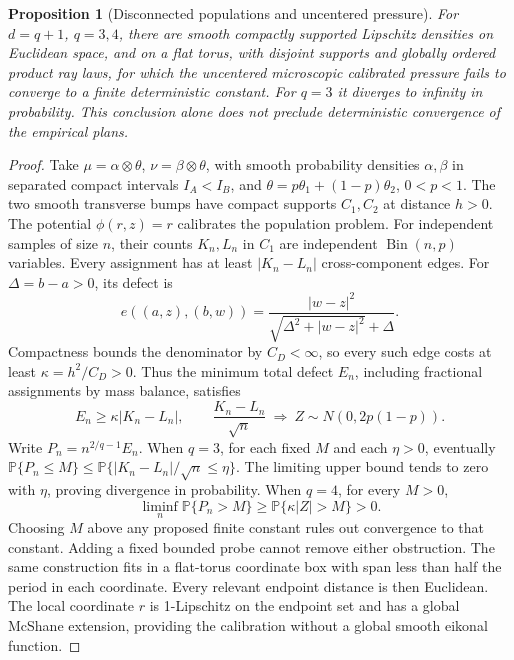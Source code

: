 \documentclass[11pt,reqno]{amsart}
\newtheorem{proposition}[theorem]{Proposition}
\theoremstyle{definition}
\theoremstyle{remark}
\numberwithin{equation}{section}
\begin{document}
\begin{proposition}[Disconnected populations and uncentered pressure]
\label{prop:disconnected-pressure-obstruction}
For \(d=q+1\), \(q=3,4\), there are smooth compactly supported
Lipschitz densities on Euclidean space, and on a flat torus, with
disjoint supports and globally ordered product ray laws, for which
the uncentered microscopic calibrated pressure fails to converge to a
finite deterministic constant. For \(q=3\) it diverges to infinity in
probability. This conclusion alone does not preclude deterministic
convergence of the empirical plans.
\end{proposition}
\begin{proof}
Take \(\mu=\alpha\otimes\theta\), \(\nu=\beta\otimes\theta\), with
smooth probability densities \(\alpha,\beta\) in separated compact
intervals \(I_A<I_B\), and
\(\theta=p\theta_1+(1-p)\theta_2\), \(0<p<1\). The two smooth
transverse bumps have compact supports \(C_1,C_2\) at distance
\(h>0\). The potential \(\phi(r,z)=r\) calibrates the population
problem. For independent samples of size \(n\), their counts \(K_n,L_n\)
in \(C_1\) are independent \(\operatorname{Bin}(n,p)\) variables.
Every assignment has at least \(|K_n-L_n|\) cross-component edges.
For \(\Delta=b-a>0\), its defect is
\[
 e((a,z),(b,w))=
 \frac{|w-z|^2}{\sqrt{\Delta^2+|w-z|^2}+\Delta}.
\]
Compactness bounds the denominator by \(C_D<\infty\), so every such
edge costs at least \(\kappa=h^2/C_D>0\). Thus the minimum total
defect \(E_n\), including fractional assignments by mass balance,
satisfies
\[
 E_n\ge\kappa|K_n-L_n|,\qquad
 \frac{K_n-L_n}{\sqrt n}\ \Rightarrow\
 Z\sim N(0,2p(1-p)).
\]
Write \(P_n=n^{2/q-1}E_n\). When \(q=3\), for each fixed \(M\) and
each \(\eta>0\), eventually
\(\mathbb P\{P_n\le M\}\le
\mathbb P\{|K_n-L_n|/\sqrt n\le\eta\}\).
The limiting upper bound tends to zero with \(\eta\), proving
divergence in probability. When \(q=4\), for every \(M>0\),
\[
 \liminf_n\mathbb P\{P_n>M\}
 \ge\mathbb P\{\kappa|Z|>M\}>0.
\]
Choosing \(M\) above any proposed finite constant rules out convergence
to that constant. Adding a fixed bounded probe cannot remove either
obstruction. The same construction fits in a flat-torus coordinate
box with span less than half the period in each coordinate. Every
relevant endpoint distance is then Euclidean. The local coordinate
\(r\) is 1-Lipschitz on the endpoint set and has a global McShane
extension, providing the calibration without a global smooth
eikonal function.
\end{proof}
\end{document}
